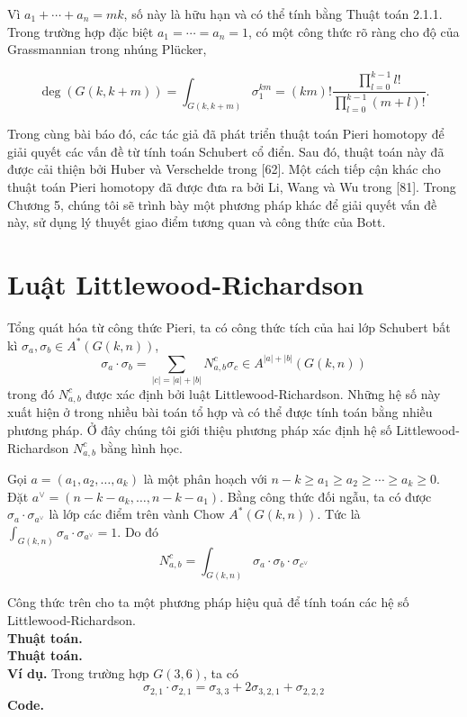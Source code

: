 \documentclass[11pt,a4paper]{book}
\begin{document}
Vì \( a_1+\cdots+a_n=m k \), số này là hữu hạn và có thể tính bằng Thuật toán 2.1.1. Trong trường hợp đặc biệt \( a_1=\cdots=a_n=1 \), có một công thức rõ ràng cho độ của Grassmannian trong nhúng Plücker,

\[
\operatorname{deg}(G(k, k+m))=\int_{G(k, k+m)} \sigma_1^{k m}=(k m) ! \frac{\prod_{l=0}^{k-1} l !}{\prod_{l=0}^{k-1}(m+l) !} .
\]

Trong cùng bài báo đó, các tác giả đã phát triển thuật toán Pieri homotopy để giải quyết các vấn đề từ tính toán Schubert cổ điển. Sau đó, thuật toán này đã được cải thiện bởi Huber và Verschelde trong [62]. Một cách tiếp cận khác cho thuật toán Pieri homotopy đã được đưa ra bởi Li, Wang và Wu trong [81]. Trong Chương 5, chúng tôi sẽ trình bày một phương pháp khác để giải quyết vấn đề này, sử dụng lý thuyết giao điểm tương quan và công thức của Bott.


\section{Luật Littlewood-Richardson}

Tổng quát hóa từ công thức Pieri, ta có công thức tích của hai lớp Schubert bất kì $\sigma_a, \sigma_b \in A^*(G(k, n))$,
$$\sigma_a \cdot \sigma_b=\sum_{|c|=|a|+|b|} N_{a, b}^c \sigma_c \in A^{|a|+|b|}(G(k, n))$$
trong đó $N_{a, b}^c$ được xác định bởi luật Littlewood-Richardson. Những hệ số này xuất hiện ở trong nhiều bài toán tổ hợp và có thể được tính toán bằng nhiều phương pháp. Ở đây chúng tôi giới thiệu phương pháp xác định hệ số Littlewood-Richardson $N_{a, b}^c$ bằng hình học.

Gọi $a=\left(a_1, a_2, \ldots, a_k\right)$ là một phân hoạch với $n-k \geq a_1 \geq a_2 \geq \cdots \geq a_k \geq 0$. Đặt $a^{\vee}=\left(n-k-a_k, \ldots, n-k-a_1\right)$. Bằng công thức đối ngẫu, ta có được $\sigma_a \cdot \sigma_{a^\vee}$ là lớp các điểm trên vành Chow $A^*(G(k, n))$. Tức là $\int_{G(k, n)} \sigma_a \cdot \sigma_{a^{\vee}}=1$. Do đó
$$N_{a, b}^c=\int_{G(k, n)} \sigma_a \cdot \sigma_b \cdot \sigma_{c^{\vee}}$$

Công thức trên cho ta một phương pháp hiệu quả để tính toán các hệ số Littlewood-Richardson.\\
\textbf{Thuật toán.}\\
\textbf{Thuật toán.}\\
\textbf{Ví dụ.} Trong trường hợp $G(3,6)$, ta có
$$\sigma_{2,1}\cdot\sigma_{2,1}=\sigma_{3,3}+2\sigma_{3,2,1}+\sigma_{2,2,2}$$
\textbf{Code.}
\end{document}
